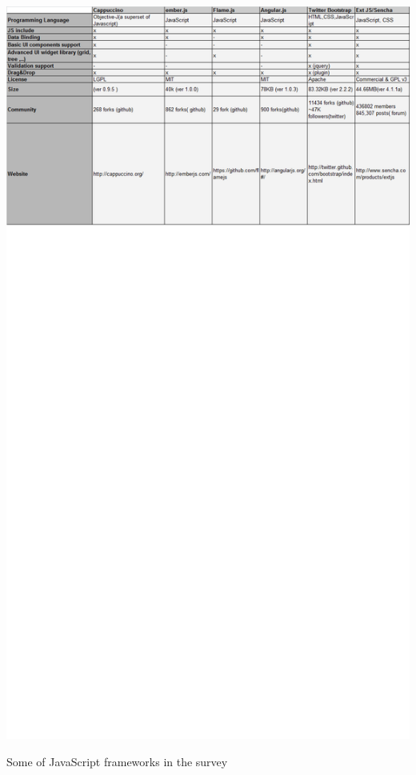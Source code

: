 \documentclass[14pt,a4paper]{extreport}
\begin{document}
			\begin{table}
				\begin{center}
					\includegraphics[scale=0.6]{JavaFrameTable2NewCriteria.png}
				
					\caption{Some of JavaScript frameworks in the survey}
				\end{center}
			
			\end{table}
\end{document}
